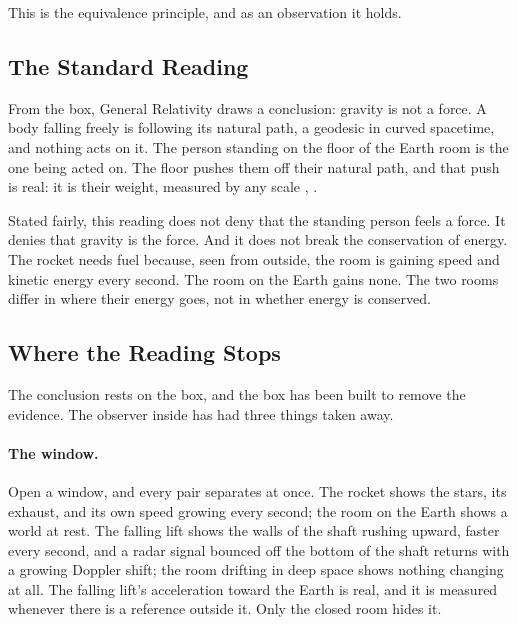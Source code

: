 This is the equivalence principle, and as an observation it holds.

\subsection*{The Standard Reading}

From the box, General Relativity draws a conclusion: gravity is not a force. A body falling freely is following its natural path, a geodesic in curved spacetime, and nothing acts on it. The person standing on the floor of the Earth room is the one being acted on. The floor pushes them off their natural path, and that push is real: it is their weight, measured by any scale \RGR{}, \RC{}.

Stated fairly, this reading does not deny that the standing person feels a force. It denies that gravity is the force. And it does not break the conservation of energy. The rocket needs fuel because, seen from outside, the room is gaining speed and kinetic energy every second. The room on the Earth gains none. The two rooms differ in where their energy goes, not in whether energy is conserved.

\subsection*{Where the Reading Stops}

The conclusion rests on the box, and the box has been built to remove the evidence. The observer inside has had three things taken away.

\paragraph{The window.} Open a window, and every pair separates at once. The rocket shows the stars, its exhaust, and its own speed growing every second; the room on the Earth shows a world at rest. The falling lift shows the walls of the shaft rushing upward, faster every second, and a radar signal bounced off the bottom of the shaft returns with a growing Doppler shift; the room drifting in deep space shows nothing changing at all. The falling lift's acceleration toward the Earth is real, and it is measured whenever there is a reference outside it. Only the closed room hides it.

